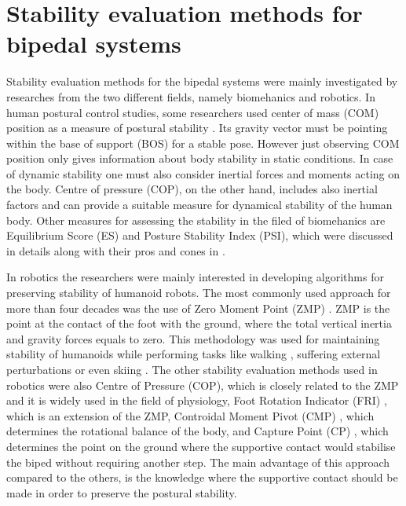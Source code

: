 \documentclass[12pt,a4paper,twoside]{article}
\begin{document}
\section{{Stability evaluation methods for bipedal systems}}

Stability evaluation methods for the bipedal systems were mainly investigated by researches from the two different fields, namely biomehanics and robotics. In human postural control studies, some researchers used center of mass (COM) position as a measure of postural stability \cite{Maki2003}. Its gravity vector must be pointing within the base of support (BOS) for a stable pose. However just observing COM position only gives information about body stability in static conditions. In case of dynamic stability one must also consider inertial forces and moments acting on the body. Centre of pressure (COP), on the other hand, includes also inertial factors and can provide a suitable measure for dynamical stability of the human body. Other measures for assessing the stability in the filed of biomehanics are Equilibrium Score (ES) and Posture Stability Index (PSI), which were discussed in details along with their pros and cones in \cite{Chaudhry2011}.

In robotics the researchers were mainly interested in developing algorithms for preserving stability of humanoid robots. The most commonly used approach for more than four decades was the use of Zero Moment Point (ZMP) \cite{Vukobratovic1969,Kemp2008,Kajita2008,Hirai1998,Huang2001}. ZMP is the point at the contact of the foot with the ground, where the total vertical inertia and gravity forces equals to zero. This methodology was used for maintaining stability of humanoids while performing tasks like walking \cite{Li1993,Arakawa1997,Harada2003}, suffering external perturbations \cite{Hyon2007} or even skiing \cite{petrivc2013reflexive}. The other stability evaluation methods used in robotics were also Centre of Pressure (COP), which is closely related to the ZMP and it is widely used in the field of physiology, Foot Rotation Indicator (FRI) \cite{Goswami1999}, which is an extension of the ZMP, Controidal Moment Pivot (CMP) \cite{Popovic2004}, which determines the rotational balance of the body, and Capture Point (CP) \cite{Pratt2006}, which determines the point on the ground where the supportive contact would stabilise the biped without requiring another step. The main advantage of this approach compared to the others, is the knowledge where the supportive contact should be made in order to preserve the postural stability.
\end{document}
